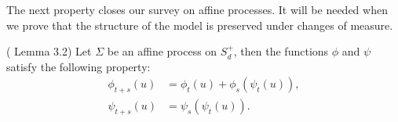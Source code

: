 



The next property closes our survey on affine processes. It will be needed when we prove that the structure of the model is preserved under changes of measure.
\begin{lemma}(\cite{article_Cuchiero} Lemma 3.2) Let $\Sigma$ be an affine process on $S_d^+$, then the functions $\phi$ and $\psi$ satisfy the following property:
\begin{align}
\phi_{t+s}(u)&=\phi_t(u)+\phi_s(\psi_t(u)),\nonumber\\
\psi_{t+s}(u)&=\psi_s(\psi_t(u)).\nonumber
\end{align}
\end{lemma}


